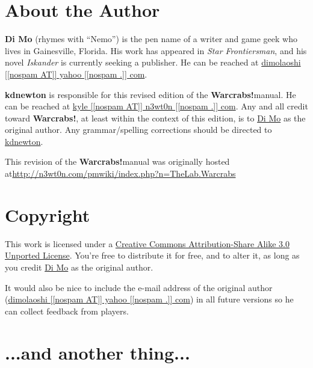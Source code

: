 \documentclass[a4paper,10pt]{article}
\newcommand{\warcrabs}{\textbf{Warcrabs!}}
\newcommand{\dimoEmail}{\href{mailto:dimolaoshi-AT-yahoo~dot~com}{dimolaoshi [[nospam AT]] yahoo [[nospam .]] com}}
\newcommand{\kyleEmail}{\href{mailto:kyle-AT-n3wt0n~dot~com}{kyle [[nospam AT]] n3wt0n [[nospam .]] com}}
\begin{document}
\section*{About the Author}
\label{sec:AbouttheAuthor}

\textbf{Di Mo} (rhymes with ``Nemo'') is the pen name of a writer and game geek who lives in Gainesville, Florida. His work has appeared in \textit{Star Frontiersman}, and his novel \textit{Iskander} is currently seeking a publisher. He can be reached at \dimoEmail.

\textbf{kdnewton} is responsible for this revised edition of the \warcrabs\hspace*{4pt}manual. He can be reached at \kyleEmail. Any and all credit toward \warcrabs, at least within the context of this edition, is to \href{mailto:mailto:dimolaoshi@yahoo.com}{Di Mo} as the original author. Any grammar/spelling corrections should be directed to \href{mailto:kyle@n3wt0n.com}{kdnewton}.

This revision of the \warcrabs\hspace*{4pt}manual was originally hosted at\newline\url{http://n3wt0n.com/pmwiki/index.php?n=TheLab.Warcrabs}

\section*{Copyright}
\label{sec:Copyright}

This work is licensed under a \href{http://creativecommons.org/licenses/by-sa/3.0/}{Creative Commons Attribution-Share Alike 3.0} \href{http://creativecommons.org/licenses/by-sa/3.0/}{Unported License}. You're free to distribute it for free, and to alter it, as long as you credit \href{mailto:mailto:dimolaoshi@yahoo.com}{Di Mo} as the original author.

It would also be nice to include the e-mail address of the original author (\dimoEmail) in all future versions so he can collect feedback from players.

\section*{...and another thing...}
\label{sec:andanotherthing}
\end{document}
